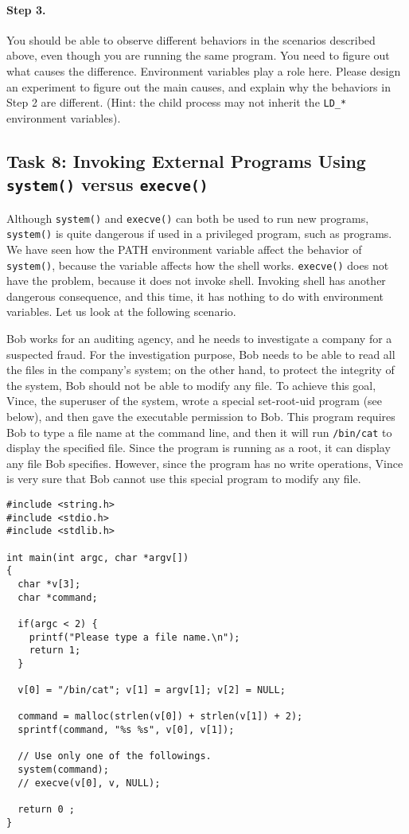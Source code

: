 \paragraph{Step 3.} 
You should be able to observe different behaviors in the scenarios
described above, even though you are running the same program.  You need 
to figure out what causes the difference. Environment variables 
play a role here. Please design an experiment to figure out the 
main causes, and explain why the behaviors in Step 2 are 
different. (Hint: the child process 
may not inherit the {\tt LD\_*} environment variables). 



\subsection{Task 8: Invoking External Programs Using {\tt system()} versus {\tt execve()}}

Although {\tt system()} and {\tt execve()} can both be used to run new
programs, {\tt system()} is quite dangerous if used in a privileged
program, such as \setuid programs. We have seen how the PATH environment
variable affect the behavior of {\tt system()}, because the variable
affects how the shell works. {\tt execve()} does not have the problem,
because it does not invoke shell. Invoking shell has another dangerous 
consequence, and this time, it has nothing to do with environment
variables.  Let us look at the following scenario.


Bob works for an auditing agency, and he needs to investigate a company for a suspected
fraud. For the investigation purpose, Bob needs to be able to read 
all the files in the 
company's \unix system; on the other hand, to protect the integrity of the system,
Bob should not be able to modify any file. 
To achieve this goal, Vince, the superuser of the system, 
wrote a special set-root-uid program (see
below), and then gave the executable permission to Bob. This program requires
Bob to type a file name at the command line, and then it will 
run {\tt /bin/cat} to display the specified file. Since the program is running
as a root, it can display any file Bob specifies. However, since the program
has no write operations, Vince is very sure that Bob cannot use this special program 
to modify any file.

\begin{lstlisting}
#include <string.h>
#include <stdio.h>
#include <stdlib.h>

int main(int argc, char *argv[])
{
  char *v[3];
  char *command;

  if(argc < 2) {
    printf("Please type a file name.\n"); 
    return 1;
  }

  v[0] = "/bin/cat"; v[1] = argv[1]; v[2] = NULL;

  command = malloc(strlen(v[0]) + strlen(v[1]) + 2);
  sprintf(command, "%s %s", v[0], v[1]);

  // Use only one of the followings.
  system(command);
  // execve(v[0], v, NULL);

  return 0 ;
}
\end{lstlisting}


